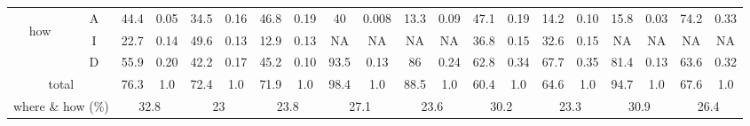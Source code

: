 \begin{table}
\begin{center}
\begin{small}
\begin{tabular}{|cc|cc|cc|cc|cc|cc|cc|cc|cc|cc|}
\multirow{3}{3mm}{\begin{sideways}\parbox{3mm}{\begin{small}how\end{small}}\end{sideways}}
 & A & 44.4 & 0.05 & 34.5 & 0.16 & 46.8 & 0.19 & 40 & 0.008 & 13.3 & 0.09 & 47.1 & 0.19 & 14.2 & 0.10 & 15.8 & 0.03 & 74.2 & 0.33 \\
 & I & 22.7 & 0.14 & 49.6 & 0.13 & 12.9 & 0.13 & NA & NA & NA & NA & 36.8 & 0.15 & 32.6 & 0.15 & NA & NA & NA & NA \\
 & D & 55.9 & 0.20 & 42.2 & 0.17 & 45.2 & 0.10 & 93.5 & 0.13 & 86 & 0.24 & 62.8 & 0.34 & 67.7 & 0.35 & 81.4 & 0.13 & 63.6 & 0.32 \\
\multicolumn{2}{|c|}{total} & 76.3 & 1.0 & 72.4 & 1.0 & 71.9 & 1.0 & 98.4 & 1.0 & 88.5 & 1.0 & 60.4 & 1.0 & 64.6 & 1.0 & 94.7 & 1.0 & 67.6 & 1.0 \\
\hline
\multicolumn{2}{|c|}{where \& how (\%)} & \multicolumn{2}{|c|}{32.8} & \multicolumn{2}{|c|}{23}& \multicolumn{2}{|c|}{23.8}& \multicolumn{2}{|c|}{27.1}& \multicolumn{2}{|c|}{23.6}& \multicolumn{2}{|c|}{30.2}& \multicolumn{2}{|c|}{23.3}& \multicolumn{2}{|c|}{30.9}& \multicolumn{2}{|c|}{26.4}\\
\hline
\end{tabular}

\end{small}
\end{center}
\end{table}
